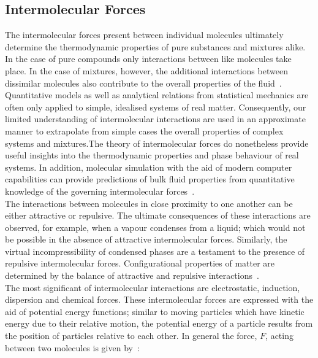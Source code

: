 \subsection{Intermolecular Forces}

The intermolecular forces present between individual molecules ultimately determine the thermodynamic properties of pure substances and mixtures alike. In the case of pure compounds only interactions between like molecules take place. In the case of mixtures, however, the additional interactions between dissimilar molecules also contribute to the overall properties of the fluid~\cite{MolecularThermodynamicsOfFluidPhaseEquilibria, GasLiquidProperties}.\\

Quantitative models as well as analytical relations from statistical mechanics are often only applied to simple, idealised systems of real matter. Consequently, our limited understanding of intermolecular interactions are used in an approximate manner to extrapolate from simple cases the overall properties of complex systems and mixtures.The theory of intermolecular forces do nonetheless provide useful insights into the thermodynamic properties and phase behaviour of real systems. In addition, molecular simulation with the aid of modern computer capabilities can provide predictions of bulk fluid properties from quantitative knowledge of the governing intermolecular forces~\cite{MolecularThermodynamicsOfFluidPhaseEquilibria}.\\

The interactions between molecules in close proximity to one another can be either attractive or repulsive. The ultimate consequences of these interactions are observed, for example, when a vapour condenses from a liquid; which would not be possible in the absence of attractive intermolecular forces. Similarly, the virtual incompressibility of condensed phases are a testament to the presence of repulsive intermolecular forces. Configurational properties of matter are determined by the balance of attractive and repulsive interactions~\cite{MolecularThermodynamicsOfFluidPhaseEquilibria}.\\

The most significant of intermolecular interactions are electrostatic, induction, dispersion and chemical forces. These intermolecular forces are expressed with the aid of potential energy functions; similar to moving particles which have kinetic energy due to their relative motion, the potential energy of a particle results from the position of particles relative to each other. In general the force, $F$, acting between two molecules is given by~\cite{MolecularThermodynamicsOfFluidPhaseEquilibria}:\

